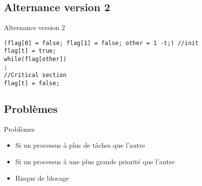 \section{\sectitle}
\begin{frame}[containsverbatim]{\sectitle}
    \def\subsectitle{Alternance version 2}
    \subsection{\subsectitle}

    \begin{exampleblock}{\subsectitle}
        \begin{verbatim}
(flag[0] = false; flag[1] = false; other = 1 -t;) //init
flag[t] = true;
while(flag[other])
;
//Critical section
flag[t] = false;
        \end{verbatim}
    \end{exampleblock}

    \def\subsectitle{Problèmes}
    \subsection{\subsectitle}
    \begin{alertblock}{\subsectitle}
        \begin{itemize}
            \item Si un processus à plus de tâches que l'autre
            \item Si un processus à une plus grande priorité que l'autre
            \item Risque de blocage
        \end{itemize}
    \end{alertblock}

\end{frame}


\def\sectitle{Peterson}
